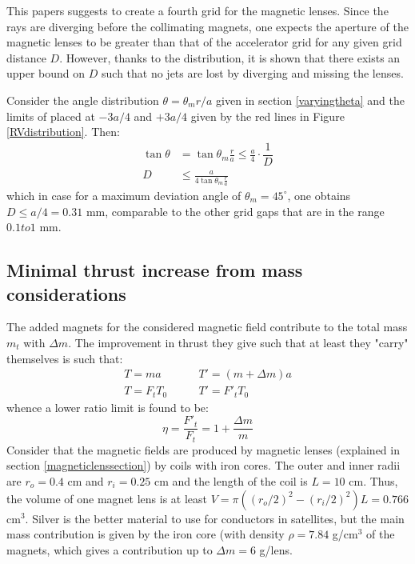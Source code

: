 \documentclass[twocolumn,12pt]{article}
\numberwithin{equation}{section} %
\numberwithin{equation}{section}
\begin{document}
This papers suggests to create a fourth grid for the magnetic lenses. Since the rays are diverging before the collimating magnets, one expects the aperture of the magnetic lenses to be greater than that of the accelerator grid for any given grid distance $D$. However, thanks to the distribution, it is shown that there exists an upper bound on $D$ such that no jets are lost by diverging and missing the lenses. 

Consider the angle distribution $\theta = \theta_m r/a$ given in section \ref{varyingtheta} and the limits of placed at $-3a/4$ and $+3a/4$ given by the red lines in Figure \ref{RVdistribution}. Then:
\begin{align*}
    \tan \theta & = \tan \theta_m \frac{r}{a} \leq \frac{a}{4} \cdot \dfrac{1}{D} \\
    D & \leq \frac{a}{4 \tan \theta_m \frac{r}{a}}
\end{align*}
which in case for a maximum deviation angle of $\theta_m = 45^{\circ}$, one obtains $D \leq a/4 = 0.31$ mm, comparable to the other grid gaps that are in the range $0.1 to 1$ mm. 


\subsection{Minimal thrust increase from mass considerations}
The added magnets for the considered magnetic field contribute to the total mass $m_t$ with $\Delta m$. The improvement in thrust they give such that at least they "carry" themselves is such that:
\begin{align}
    T = m a \qquad & T' = (m + \Delta m) a \\
    T = F_t T_0 \qquad & T' = F'_t T_0
\end{align}
whence a lower ratio limit is found to be:
\begin{equation}
    \eta = \frac{F'_t}{F_t} = 1 + \frac{\Delta m}{m}
\end{equation}
Consider that the magnetic fields are produced by magnetic lenses (explained in section \ref{magneticlenssection}) by coils with iron cores. The outer and inner radii are $r_o = 0.4$ cm and $r_i = 0.25$ cm and the length of the coil is $L = 10$ cm. Thus, the volume of one magnet lens is at least $V = \pi ((r_o/2)^2 - (r_i/2)^2) L = 0.766$ cm$^3$. Silver is the better material to use for conductors in satellites, but the main mass contribution is given by the iron core (with density $\rho = 7.84$ g/cm$^3$ of the magnets, which gives a contribution up to $\Delta m = 6$ g/lens. 
\end{document}
